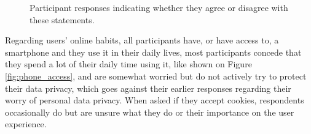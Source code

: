 \begin{figure}[H]
    \begin{center}
        \caption{Participant responses indicating whether they agree or disagree with these statements.}
        \label{fig:activity_contributes_profiling}
    \end{center}
\end{figure}

Regarding users' online habits, all participants have, or have access to, a smartphone
and they use it in their daily lives, most participants concede that they spend a lot
of their daily time using it, like shown on Figure \ref{fig:phone_access}, and are
somewhat worried but do not actively try to protect their data privacy, which
goes against their earlier responses regarding their worry of personal data privacy.
When asked if they accept
cookies, respondents occasionally do but are unsure what they do or their
importance on the user experience.


